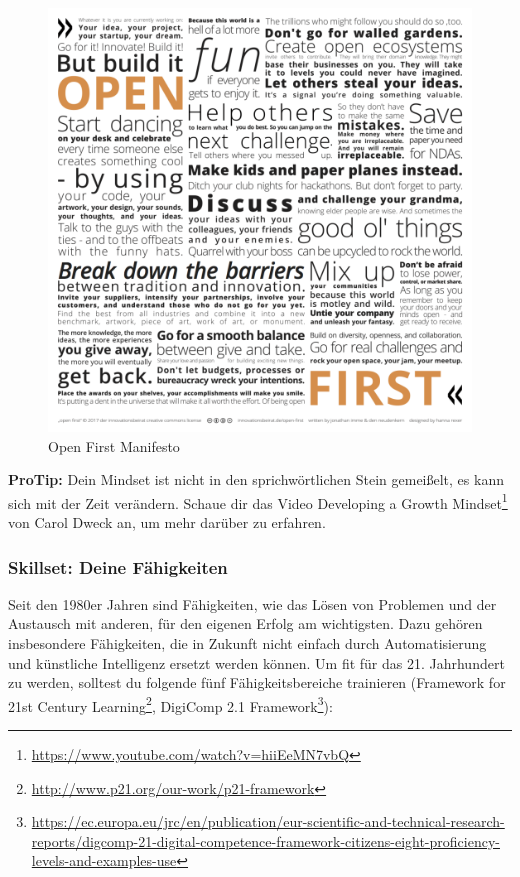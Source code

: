 \documentclass[
  ngerman,
  paper=a4,
,captions=tableheading
]{scrartcl}
\DeclareRobustCommand{\href}[2]{#2\footnote{\url{#1}}}
\begin{document}
\begin{figure}
\centering
\includegraphics{./tex2pdf.-af94b87e0fdb9aa6/18770edc2ff369daeebec9453c72ff40587e97ed.png}
\caption{Open First Manifesto}
\end{figure}

\textbf{ProTip:} Dein Mindset ist nicht in den sprichwörtlichen Stein
gemeißelt, es kann sich mit der Zeit verändern. Schaue dir das Video
\href{https://www.youtube.com/watch?v=hiiEeMN7vbQ}{Developing a Growth
Mindset} von Carol Dweck an, um mehr darüber zu erfahren.

\hypertarget{skillset-deine-fuxe4higkeiten}{%
\subsubsection{Skillset: Deine
Fähigkeiten}\label{skillset-deine-fuxe4higkeiten}}

Seit den 1980er Jahren sind Fähigkeiten, wie das Lösen von Problemen und
der Austausch mit anderen, für den eigenen Erfolg am wichtigsten. Dazu
gehören insbesondere Fähigkeiten, die in Zukunft nicht einfach durch
Automatisierung und künstliche Intelligenz ersetzt werden können. Um fit
für das 21. Jahrhundert zu werden, solltest du folgende fünf
Fähigkeitsbereiche trainieren
(\href{http://www.p21.org/our-work/p21-framework}{Framework for 21st
Century Learning},
\href{https://ec.europa.eu/jrc/en/publication/eur-scientific-and-technical-research-reports/digcomp-21-digital-competence-framework-citizens-eight-proficiency-levels-and-examples-use}{DigiComp
2.1 Framework}):
\end{document}
